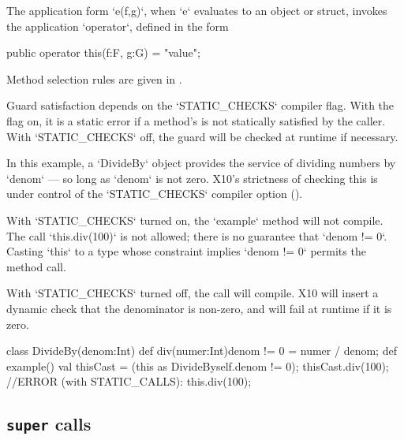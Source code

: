 The application form \xcd`e(f,g)`, when \xcd`e` evaluates to an object or
struct, invokes the application \xcd`operator`, 
defined in the form 
\begin{xten}
public operator this(f:F, g:G) = "value";
\end{xten}


Method selection rules are given in .

Guard satisfaction depends on the \xcd`STATIC_CHECKS` compiler flag. 
With the flag on,
it is a static error if a method's  is not statically
satisfied by the 
caller.  
With \xcd`STATIC_CHECKS` off, the guard will be checked at runtime if
necessary. 

\begin{ex}
In this example, a \xcd`DivideBy` object provides the service of dividing
numbers by \xcd`denom` --- so long as \xcd`denom` is not zero. 
X10's strictness of checking this is under control of the \xcd`STATIC_CHECKS`
compiler option ().  

With \xcd`STATIC_CHECKS` turned on,  the \xcd`example` method will not
compile.  The call \xcd`this.div(100)`  is not allowed; there is no
guarantee that \xcd`denom != 0`.  Casting \xcd`this` to a type 
whose constraint implies \xcd`denom != 0` permits the method call.

With \xcd`STATIC_CHECKS` turned off, the call will compile.
X10 will insert a dynamic check that the denominator is non-zero, and will
fail at runtime if it is zero.

\begin{xten}
class DivideBy(denom:Int) {
  def div(numer:Int){denom != 0} = numer / denom;
  def example() {
     val thisCast = (this as DivideBy{self.denom != 0});
     thisCast.div(100);
     //ERROR (with STATIC_CALLS): this.div(100);  
  }
}
\end{xten}



\end{ex}


\subsection{{\tt super} calls}

